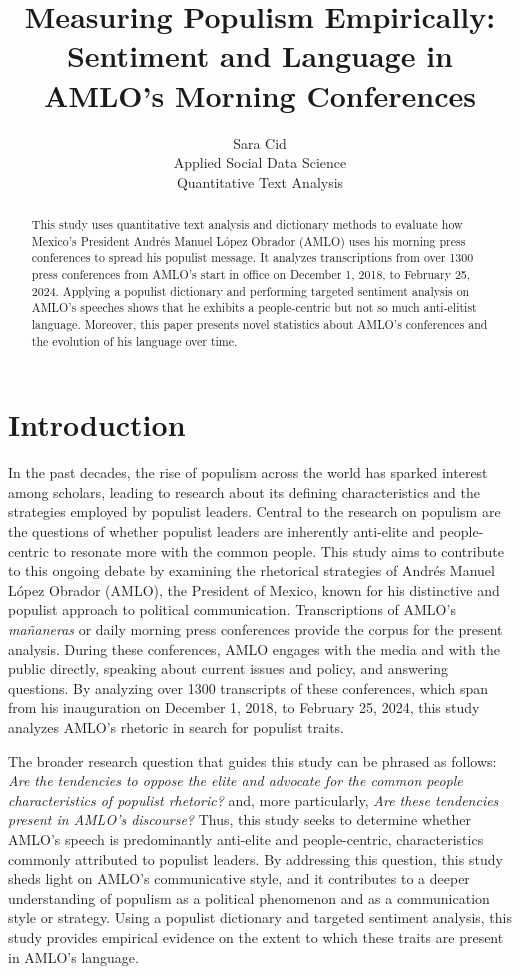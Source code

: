 \documentclass[]{article}
\title{Measuring Populism Empirically: Sentiment and Language in AMLO's Morning Conferences}
\author{Sara Cid \\  Applied Social Data Science \\  Quantitative Text Analysis}
\begin{document}
\maketitle

\begin{abstract}
	
	This study uses quantitative text analysis and dictionary methods to evaluate how Mexico's President Andrés Manuel López Obrador (AMLO) uses his morning press conferences to spread his populist message. It analyzes transcriptions from over 1300 press conferences from AMLO's start in office on December 1, 2018, to February 25, 2024. Applying a populist dictionary and performing targeted sentiment analysis on AMLO's speeches shows that he exhibits a people-centric but not so much anti-elitist language. Moreover, this paper presents novel statistics about AMLO's conferences and the evolution of his language over time.

\end{abstract}

\section{Introduction} 

In the past decades, the rise of populism across the world has sparked interest among scholars, leading to research about its defining characteristics and the strategies employed by populist leaders. Central to the research on populism are the questions of whether populist leaders are inherently anti-elite and people-centric to resonate more with the common people. This study aims to contribute to this ongoing debate by examining the rhetorical strategies of Andrés Manuel López Obrador (AMLO), the President of Mexico, known for his distinctive and populist approach to political communication. Transcriptions of AMLO's \textit{mañaneras} or daily morning press conferences provide the corpus for the present analysis. During these conferences, AMLO engages with the media and with the public directly, speaking about current issues and policy, and answering questions. By analyzing over 1300 transcripts of these conferences, which span from his inauguration on December 1, 2018, to February 25, 2024, this study analyzes AMLO's rhetoric in search for populist traits.  

The broader research question that guides this study can be phrased as follows: \textit{Are the tendencies to oppose the elite and advocate for the common people characteristics of populist rhetoric?} and, more particularly, \textit{Are these tendencies present in AMLO's discourse?} Thus, this study seeks to determine whether AMLO's speech is predominantly anti-elite and people-centric, characteristics commonly attributed to populist leaders. By addressing this question, this study sheds light on AMLO's communicative style, and it contributes to a deeper understanding of populism as a political phenomenon and as a communication style or strategy. Using a populist dictionary and targeted sentiment analysis, this study provides empirical evidence on the extent to which these traits are present in AMLO's language. 
\end{document}
